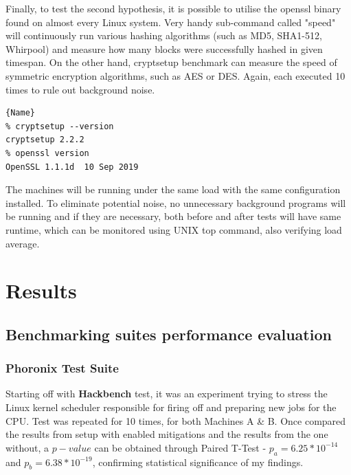 \documentclass{csfourzero}
\begin{document}
Finally, to test the second hypothesis, it is possible to utilise the openssl binary found on almost every Linux system. Very handy sub-command called "speed" will continuously run various hashing algorithms (such as MD5, SHA1-512, Whirpool) and measure how many blocks were successfully hashed in given timespan. On the other hand, cryptsetup benchmark can measure the speed of symmetric encryption algorithms, such as AES or DES. Again, each executed 10 times to rule out background noise.

\begin{lstlisting}[caption=Versions of crypsetup and openssl, frame=tlrb, basicstyle=\small]{Name}
% cryptsetup --version
cryptsetup 2.2.2
% openssl version     
OpenSSL 1.1.1d  10 Sep 2019
\end{lstlisting}

The machines will be running under the same load with the same configuration installed. To eliminate potential noise, no unnecessary background programs will be running and if they are necessary, both before and after tests will have same runtime, which can be monitored using UNIX top command, also verifying load average. 

\section{Results}
\label{sec:results}

\subsection{Benchmarking suites performance evaluation}

\subsubsection{Phoronix Test Suite}

Starting off with \textbf{Hackbench} test, it was an experiment trying to stress the Linux kernel scheduler responsible for firing off and preparing new jobs for the CPU. Test was repeated for 10 times, for both Machines A \& B. Once compared the results from setup with enabled mitigations and the results from the one without, a $p-value$ can be obtained through Paired T-Test - $p_{a} = 6.25 * 10^{-14}$ and $p_{b} = 6.38 * 10^{-19}$, confirming statistical significance of my findings. 
\end{document}
